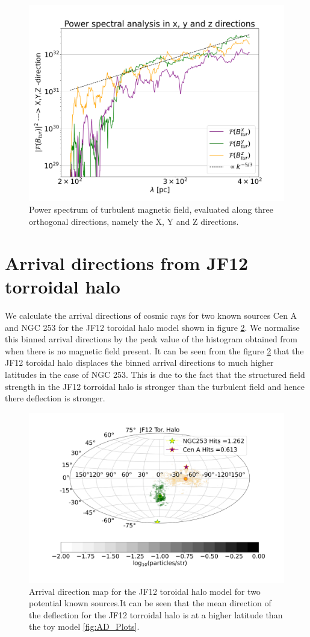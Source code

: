 \documentclass[usenatbib]{mnras}
\begin{document}
\begin{figure}
    \includegraphics[width = 0.49\linewidth]{Images/Jan27_Test_PowerSpectrum_vs_lambda_seed_10_lmin_200.0lmax_400.0.png}
    \caption{Power spectrum of turbulent magnetic field, evaluated along three orthogonal directions, namely the X, Y and Z directions.}
    \label{fig:PowerSpectrum}
\end{figure}
\section{Arrival directions from JF12 torroidal halo}
\label{Appendix_C}
We calculate the arrival directions of cosmic rays for two known sources Cen A and NGC 253 for the JF12 toroidal halo model \cite{JF12} shown in figure \ref{JF12_AD}. We normalise this binned arrival directions by the peak value of the histogram obtained from when there is no magnetic field present. It can be seen from the figure \ref{JF12_AD} that the JF12 toroidal halo displaces the binned arrival directions to much higher latitudes in the case of NGC 253. This is due to the fact that the structured field strength in the JF12 torroidal halo is stronger than the turbulent field and hence there deflection is stronger. 
\begin{figure}
\centering
\includegraphics[width=0.49\linewidth]{Images/Bins_180_CenA_NGC253_JF12_Halo_40_EeV.png}
 \caption{Arrival direction map for the JF12 toroidal halo model for two potential known sources.It can be seen that the mean direction of the deflection for the JF12 torroidal halo is at a higher latitude than the toy model \ref{fig:AD_Plots}.}
\label{JF12_AD}
\end{figure}
\end{document}
